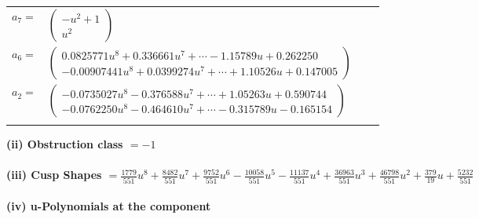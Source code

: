 \documentclass[1p]{elsarticle_modified}
\theoremstyle{definition}
\begin{document}
\begin{tabular}{m{7pt} m{180pt} m{7pt} m{180pt} }
\flushright $a_{7}=$&$\begin{pmatrix}- u^2+1\\u^2\end{pmatrix}$ \\
\flushright $a_{6}=$&$\begin{pmatrix}0.0825771 u^{8}+0.336661 u^{7}+\cdots-1.15789 u+0.262250\\-0.00907441 u^{8}+0.0399274 u^{7}+\cdots+1.10526 u+0.147005\end{pmatrix}$ \\
\flushright $a_{2}=$&$\begin{pmatrix}-0.0735027 u^{8}-0.376588 u^{7}+\cdots+1.05263 u+0.590744\\-0.0762250 u^{8}-0.464610 u^{7}+\cdots-0.315789 u-0.165154\end{pmatrix}$\\&\end{tabular}
\flushleft \textbf{(ii) Obstruction class $= -1$}\\~\\
\flushleft \textbf{(iii) Cusp Shapes $= \frac{1779}{551} u^8+\frac{8482}{551} u^7+\frac{9752}{551} u^6-\frac{10058}{551} u^5-\frac{11137}{551} u^4+\frac{36963}{551} u^3+\frac{46798}{551} u^2+\frac{379}{19} u+\frac{5232}{551}$}\\~\\
\newpage\renewcommand{\arraystretch}{1}
\flushleft \textbf{(iv) u-Polynomials at the component}\newline \\
\end{document}
